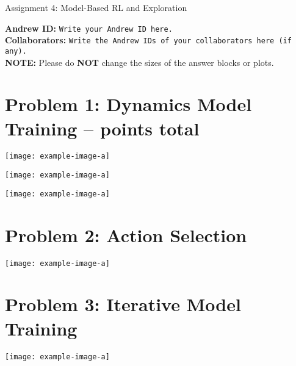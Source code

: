 \documentclass{article}
\begin{document}

\begin{centering}
    {\Large Assignment 4: Model-Based RL and Exploration
} \\
    \vspace{.25cm}
\end{centering}
\vspace{0.25cm}

\textbf{Andrew ID:} \texttt{Write your Andrew ID here.} \\
\textbf{Collaborators:} \texttt{Write the Andrew IDs of your collaborators here (if any).}\\
\textbf{NOTE:} Please do \textbf{NOT} change the sizes of the answer blocks or plots.

\section{Problem 1: Dynamics Model Training --  points total\rbrack}
\begin{answer}[title=Theory questions,height=4.5cm,width=\linewidth]
\end{answer}


\begin{answer}[title=Plot,height=9.5cm,width=\linewidth]
\centering
\texttt{[image: example-image-a]}
\end{answer}

\begin{answer}[title=Plot,height=9.5cm,width=\linewidth]
\centering
\texttt{[image: example-image-a]}
\end{answer}

\begin{answer}[title=Plot,height=9.5cm,width=\linewidth]
\centering
\texttt{[image: example-image-a]}
\end{answer}

\section{Problem 2: Action Selection}
\begin{answer}[title=Plot,height=9.5cm,width=\linewidth]
\centering
\texttt{[image: example-image-a]}
\end{answer}



\section{Problem 3: Iterative Model Training}
\begin{answer}[title=Plot,height=9.5cm,width=\linewidth]
\centering
\texttt{[image: example-image-a]}
\end{answer}
\end{document}
